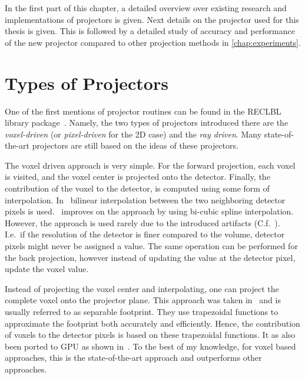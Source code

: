 In the first part of this chapter, a detailed overview over existing research and implementations of
projectors is given. Next details on the projector used for this thesis is given. This is followed
by a detailed study of accuracy and performance of the new projector compared to other projection
methods in \autoref{chap:experiments}.

\section{Types of Projectors}\label{sec:projector_types}

One of the first mentions of projector routines can be found in the RECLBL library
package~\cite{huesman_reclbl_1977}. Namely, the two types of projectors introduced there are the
\textit{voxel-driven} (or \textit{pixel-driven} for the 2D case) and the \textit{ray driven}. Many
state-of-the-art projectors are still based on the ideas of these projectors.

The voxel driven approach is very simple. For the forward projection, each voxel is visited, and the
voxel center is projected onto the detector. Finally, the contribution of the voxel to the detector,
is computed using some form of interpolation. In~\cite{peters_algorithms_1981} bilinear
interpolation between the two neighboring detector pixels is used.~\cite{harauz_interpolation_1983}
improves on the approach by using bi-cubic spline interpolation. However, the approach is used
rarely due to the introduced artifacts (C.f.~\cite[Chapter~3.3]{levakhina_three-dimensional_2014}).
I.e.\ if the resolution of the detector is finer compared to the volume, detector pixels might never
be assigned a value. The same operation can be performed for the back projection, however instead of
updating the value at the detector pixel, update the voxel value.

Instead of projecting the voxel center and interpolating, one can project the complete voxel onto
the projector plane. This approach was taken in~\cite{long_3d_2010, long_3d_2010-1} and is usually
referred to as separable footprint. They use trapezoidal functions to approximate the footprint both
accurately and efficiently. Hence, the contribution of voxels to the detector pixels is based on
these trapezoidal functions. It as also been ported to \gls{GPU} as shown in~\cite{wu_gpu_2011,
	xie_effective_2015, chapdelaine_new_2018}. To the best of my knowledge, for voxel based
approaches, this is the state-of-the-art approach and outperforms other approaches.


